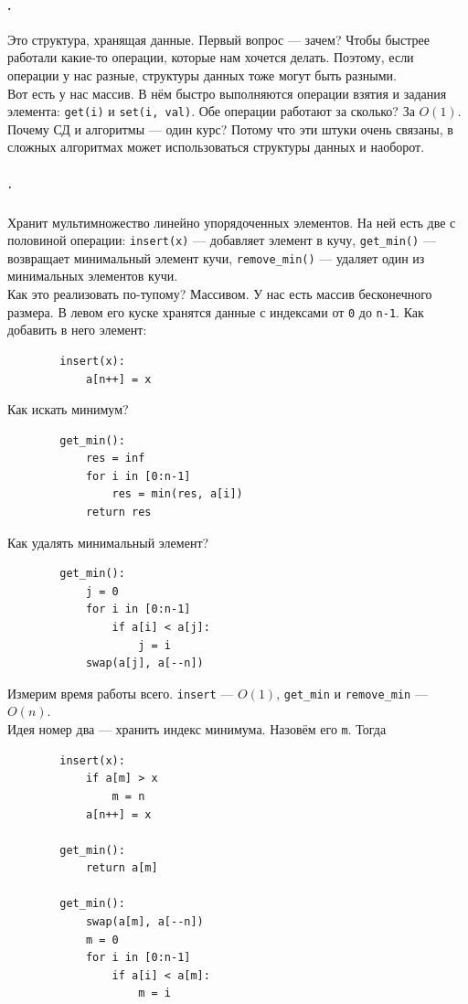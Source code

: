 \documentclass{article}
\newcommand{\pseudo}{PseudoLexer.py:PseudoLexer -x}
\newcommand{\pseudocode}[1]{\texttt{#1}}
\begin{document}
    \paragraph{.}
    Это структура, хранящая данные. Первый вопрос --- зачем? Чтобы быстрее работали какие-то операции, которые нам хочется делать. Поэтому, если операции у нас разные, структуры данных тоже могут быть разными.\\
    Вот есть у нас массив. В нём быстро выполняются операции взятия и задания элемента: \pseudocode{get(i)} и \pseudocode{set(i, val)}. Обе операции работают за сколько? За $O(1)$.\\
    Почему СД и алгоритмы --- один курс? Потому что эти штуки очень связаны, в сложных алгоритмах может использоваться структуры данных и наоборот.\\
    \subparagraph{.}
    Хранит мультимножество линейно упорядоченных элементов. На ней есть две с половиной операции: \pseudocode{insert(x)} --- добавляет элемент в кучу, \pseudocode{get_min()} --- возвращает минимальный элемент кучи, \pseudocode{remove_min()} --- удаляет один из минимальных элементов кучи.\\
    Как это реализовать по-тупому? Массивом. У нас есть массив бесконечного размера. В левом его куске хранятся данные с индексами от \pseudocode{0} до \pseudocode{n-1}. Как добавить в него элемент:
    \begin{verbatim}
        insert(x):
            a[n++] = x
    \end{verbatim}
    Как искать минимум?
    \begin{verbatim}
        get_min():
            res = inf
            for i in [0:n-1]
                res = min(res, a[i])
            return res
    \end{verbatim}
    Как удалять минимальный элемент?
    \begin{verbatim}
        get_min():
            j = 0
            for i in [0:n-1]
                if a[i] < a[j]:
                    j = i
            swap(a[j], a[--n])
    \end{verbatim}
    Измерим время работы всего. \pseudocode{insert} --- $O(1)$, \pseudocode{get_min} и \pseudocode{remove_min} --- $O(n)$.\\
    Идея номер два --- хранить индекс минимума. Назовём его \pseudocode{m}. Тогда
    \begin{verbatim}
        insert(x):
            if a[m] > x
                m = n
            a[n++] = x

        get_min():
            return a[m]

        get_min():
            swap(a[m], a[--n])
            m = 0
            for i in [0:n-1]
                if a[i] < a[m]:
                    m = i
    \end{verbatim}
\end{document}
